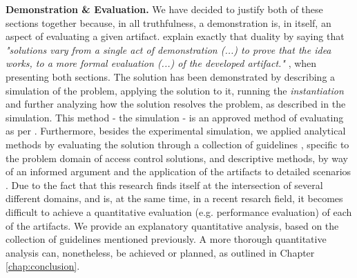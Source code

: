 \textbf{Demonstration \& Evaluation.} We have decided to justify both of these sections together because, in all truthfulness, a demonstration is, in itself, an aspect of evaluating a given artifact. \citeauthor{peffers_design_2007} \cite{peffers_design_2007} explain exactly that duality by saying that \textit{"solutions vary from a single act of demonstration (...) to prove that the idea works, to a more formal evaluation (...) of the developed artifact."} \cite[13]{peffers_design_2007}, when presenting both sections. The solution has been demonstrated by describing a simulation of the problem, applying the solution to it, running the \textit{instantiation} and further analyzing how the solution resolves the problem, as described in the simulation. This method - the simulation - is an approved method of evaluating as per \citeauthor{hevner_design_2004} \cite[13]{hevner_design_2004}. Furthermore, besides the experimental simulation, we applied analytical methods by evaluating the solution through a collection of guidelines \cite{hu_guidelines_2012}, specific to the problem domain of access control solutions, and descriptive methods, by way of an informed argument and the application of the artifacts to detailed scenarios \cite[86]{peffers_design_2007}. Due to the fact that this research finds itself at the intersection of several different domains, and is, at the same time, in a recent resarch field, it becomes difficult to achieve a quantitative evaluation (e.g. performance evaluation) of each of the artifacts. We provide an explanatory quantitative analysis, based on the collection of guidelines mentioned previously. A more thorough quantitative analysis can, nonetheless, be achieved or planned, as outlined in Chapter \ref{chap:conclusion}.

